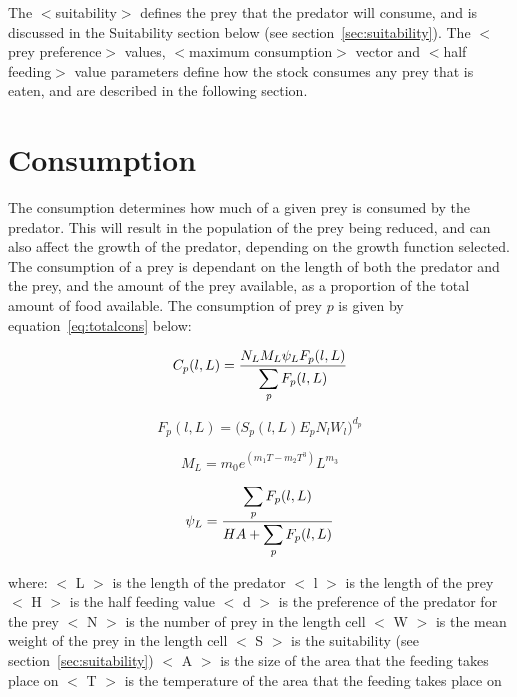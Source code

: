 \documentclass[10pt,twoside]{book}
\begin{document}
The $<$suitability$>$ defines the prey that the predator will consume, and is discussed in the Suitability section below (see section~\ref{sec:suitability}).  The $<$prey preference$>$ values, $<$maximum consumption$>$ vector and $<$half feeding$>$ value parameters define how the stock consumes any prey that is eaten, and are described in the following section.

\section{Consumption}\label{sec:consumption}
The consumption determines how much of a given prey is consumed by the predator.  This will result in the population of the prey being reduced, and can also affect the growth of the predator, depending on the growth function selected.  The consumption of a prey is dependant on the length of both the predator and the prey, and the amount of the prey available, as a proportion of the total amount of food available.  The consumption of prey $p$ is given by equation~\ref{eq:totalcons} below:

\begin{equation}\label{eq:totalcons}
C_{p}(l, L) = \frac{N_{L} M_{L} \psi_{L} F_{p}(l, L)}{\displaystyle \sum_{\it p} F_{p}(l, L)}
\end{equation}

\begin{equation}\label{eq:preycons}
F_{p}(l, L) =\Big( S_{p}(l, L) E_{p} N_{l} W_{l} \Big) ^{d_{p}}
\end{equation}

\begin{equation}\label{eq:maxcons}
M_{L} = m_{0} e^{(m_{1}T - m_{2}T^3)} L^{m_{3}}
\end{equation}

\begin{equation}\label{eq:feedlevel}
\psi_{L} = \frac{\displaystyle \sum_{\it p} F_{p}(l, L)}{H A + \displaystyle \sum_{\it p} F_{p}(l, L)}
\end{equation}

where:\newline
$<$ L $>$ is the length of the predator\newline
$<$ l $>$ is the length of the prey\newline
$<$ H $>$ is the half feeding value\newline
$<$ d $>$ is the preference of the predator for the prey\newline
$<$ N $>$ is the number of prey in the length cell\newline
$<$ W $>$ is the mean weight of the prey in the length cell\newline
$<$ S $>$ is the suitability (see section~\ref{sec:suitability})\newline
$<$ A $>$ is the size of the area that the feeding takes place on\newline
$<$ T $>$ is the temperature of the area that the feeding takes place on
\end{document}
